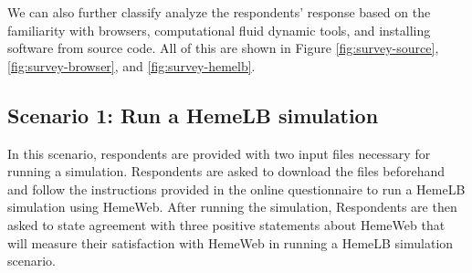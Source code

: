 \vspace{0.5cm}

\noindent%
\begin{minipage}{\linewidth}%
 \label{fig:survey-hemelb}%
\end{minipage}

\vspace{0.5cm}


We can also further classify analyze the respondents' response based on the familiarity with browsers, computational fluid dynamic tools, and installing software from source code. All of this are shown in Figure \ref{fig:survey-source}, \ref{fig:survey-browser}, and \ref{fig:survey-hemelb}.



\subsection{Scenario 1: Run a HemeLB simulation}

In this scenario, respondents are provided with two input files necessary for running a simulation. Respondents are asked to download the files beforehand and follow the instructions provided in the online questionnaire to run a HemeLB simulation using HemeWeb.  After running the simulation, Respondents are then asked to state agreement with three positive statements about HemeWeb that will measure their satisfaction with HemeWeb in running a HemeLB simulation scenario. 



